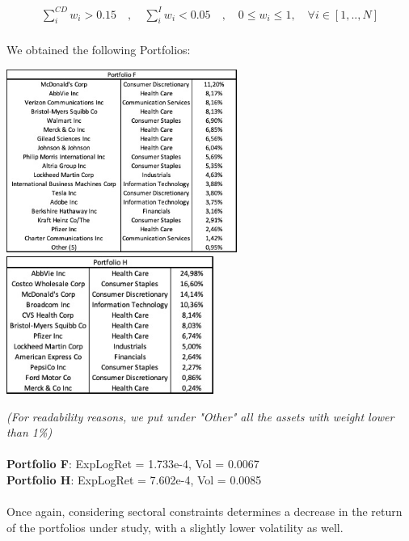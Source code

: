 \documentclass{assignment}
\begin{document}
\begin{align*}
    \sum_{i}^{CD}{w_{i}} > 0.15 \quad , \quad 
    \sum_{i}^{I}{w_{i}} < 0.05 \quad , \quad
    0\leq w_i \leq 1 ,\quad  \forall i\in \left [ 1,..,N \right ]  
\end{align*}\\
We obtained the following Portfolios: 
\begin{center}
    \includegraphics[height=6cm]
    {assets/Port_F.jpg}
    \quad
    \includegraphics[height=4.5cm]
    {assets/Port_H.jpg}
\end{center}
\textit{(For readability reasons, we put under "Other" all the assets with weight lower than 1\%)}
\\\\
\textbf{Portfolio F}: ExpLogRet = 1.733e-4, Vol = 0.0067\\ 
\textbf{Portfolio H}: ExpLogRet = 7.602e-4, Vol = 0.0085\\\\
Once again, considering sectoral constraints determines a decrease in the return of the portfolios
under study, with a slightly lower volatility as well.
\end{document}
